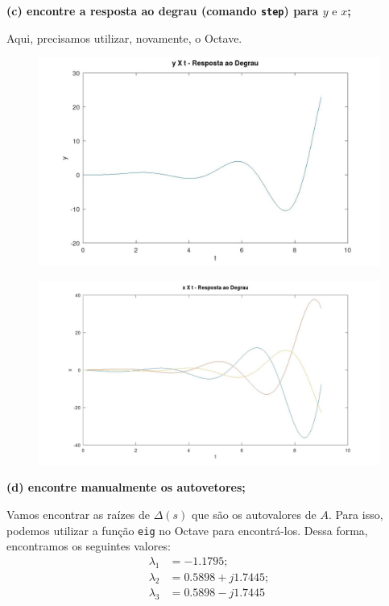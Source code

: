 \documentclass[11pt]{article}
\begin{document}
\textbf{(c) encontre a resposta ao degrau (comando \texttt{step}) para $y \text{ e } x$;}

Aqui, precisamos utilizar, novamente, o Octave.

\begin{figure}[h]
  \includegraphics[scale=0.3]{plot1c1.jpg}
  \centering
\end{figure}
\begin{figure}[h]
  \includegraphics[scale=0.25]{plot1c2.jpg}
  \centering
\end{figure}

\textbf{(d) encontre manualmente os autovetores;}

Vamos encontrar as raízes de $\Delta(s)$ que são os autovalores de $A$. Para isso, podemos utilizar a função \texttt{eig} no Octave para encontrá-los. Dessa forma, encontramos os seguintes valores:
\begin{align*}
  \lambda_1 &= -1.1795;\\
  \lambda_2 &= 0.5898 + j1.7445;\\
  \lambda_3 &= 0.5898 - j1.7445
\end{align*}
\end{document}

